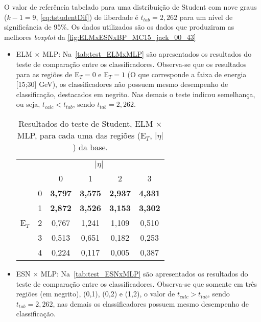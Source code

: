 O valor de referência tabelado para uma distribuição de Student com nove graus ($k-1=9$, \autoref{eq:tstudentDif}) de liberdade é $t_{tab} = 2,262$ para um nível de significância de 95\%. Os dados utilizados são os dados que produziram as melhores \textit{boxplot} da \autoref{fig:ELMxESNxBP_MC15_jack_00_43}

\begin{itemize}
	\item ELM $\times$ MLP: Na~\autoref{tab:test_ELMxMLP} são apresentados os resultados do teste de comparação entre os classificadores. Observa-se que os resultados para as regiões de E$_T = 0$ e E$_T = 1$ (O que corresponde a faixa de energia [15;30] GeV), os classificadores não possuem mesmo desempenho de classificação, destacados em negrito. Nas demais o teste indicou semelhança, ou seja, $t_{calc}< t_{tab}$, sendo $t_{tab}= 2,262$.
	\begin{table}[H]
		\centering
		\caption{Resultados do teste de Student, ELM $\times$ MLP, para cada uma das regiões (E$_T$, $|\eta|$) da base.}
		\begin{small}
		\label{tab:test_ELMxMLP}
		\setlength{\extrarowheight}{1pt}       %
		\begin{tabular}{*{6}{c}}\toprule
				& \multicolumn{5}{c}{$|\eta|$}\\\cmidrule(lr){3-6}
						&   &     0   &     1   &    2    &   3 \\ \cmidrule(lr){3-6}
\multirow{5}{*}{E$_T$}	& 0	& \textbf{3,797} & \textbf{3,575} & \textbf{2,937} & \textbf{4,331}  \\\cmidrule(lr){2-2}
						& 1	& \textbf{2,872} & \textbf{3,526} & \textbf{3,153} & \textbf{3,302} \\\cmidrule(lr){2-2}
						& 2	& 0,767 & 1,241 & 1,109 & 0,510   \\\cmidrule(lr){2-2}
						& 3	& 0,513 & 0,651 & 0,182 & 0,253  \\\cmidrule(lr){2-2}
						& 4	& 0,224 & 0,117 & 0,005 & 0,387  \\\bottomrule
		\end{tabular}
		\end{small}
	\end{table}


	\item ESN $\times$ MLP: Na~\autoref{tab:test_ESNxMLP} são apresentados os resultados do teste de comparação entre os classificadores. Observa-se que somente em três regiões (em negrito), (0,1), (0,2) e (1,2), o valor de $t_{calc}> t_{tab}$, sendo $ t_{tab}= 2,262$, nas demais os classificadores possuem mesmo desempenho de classificação.
	

\end{itemize}
